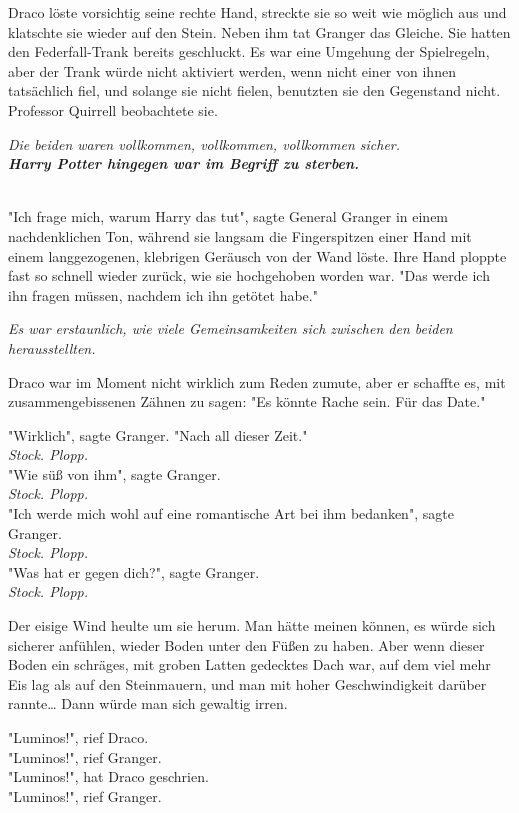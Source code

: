 {Draco löste vorsichtig seine rechte Hand, streckte sie so weit wie möglich aus und klatschte sie wieder auf den Stein. Neben ihm tat Granger das Gleiche. Sie hatten den Federfall-Trank bereits geschluckt. Es war eine Umgehung der Spielregeln, aber der Trank würde nicht aktiviert werden, wenn nicht einer von ihnen tatsächlich fiel, und solange sie nicht fielen, benutzten sie den Gegenstand nicht. Professor Quirrell beobachtete sie.

\emph{Die beiden waren vollkommen, vollkommen, vollkommen sicher.}\\ \textbf{\emph{Harry Potter hingegen war im Begriff zu sterben.}\\ }\strut \\ "Ich frage mich, warum Harry das tut", sagte General Granger in einem nachdenklichen Ton, während sie langsam die Fingerspitzen einer Hand mit einem langgezogenen, klebrigen Geräusch von der Wand löste. Ihre Hand ploppte fast so schnell wieder zurück, wie sie hochgehoben worden war. "Das werde ich ihn fragen müssen, nachdem ich ihn getötet habe."

\emph{Es war erstaunlich, wie viele Gemeinsamkeiten sich zwischen den beiden herausstellten.}

Draco war im Moment nicht wirklich zum Reden zumute, aber er schaffte es, mit zusammengebissenen Zähnen zu sagen: "Es könnte Rache sein. Für das Date."

"Wirklich", sagte Granger. "Nach all dieser Zeit."\\ \emph{Stock. Plopp.}\\ "Wie süß von ihm", sagte Granger.\\ \emph{Stock. Plopp.}\\ "Ich werde mich wohl auf eine romantische Art bei ihm bedanken", sagte Granger.\\ \emph{Stock. Plopp.}\\ "Was hat er gegen dich?", sagte Granger.\\ \emph{Stock. Plopp.}

Der eisige Wind heulte um sie herum. Man hätte meinen können, es würde sich sicherer anfühlen, wieder Boden unter den Füßen zu haben. Aber wenn dieser Boden ein schräges, mit groben Latten gedecktes Dach war, auf dem viel mehr Eis lag als auf den Steinmauern, und man mit hoher Geschwindigkeit darüber rannte… Dann würde man sich gewaltig irren.

"Luminos!", rief Draco.\\ "Luminos!", rief Granger.\\ "Luminos!", hat Draco geschrien.\\ "Luminos!", rief Granger.

}

